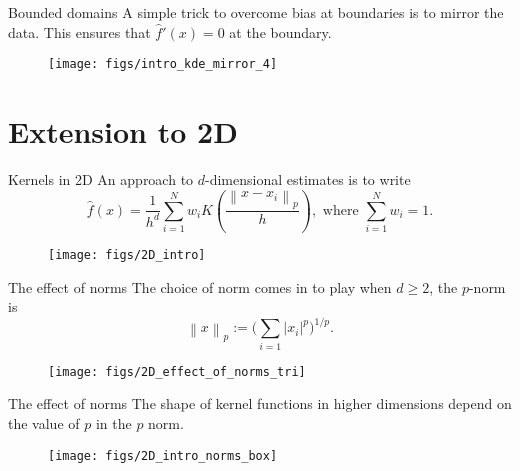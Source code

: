 \documentclass[11pt, aspectratio=149]{beamer}
\theoremstyle{plain}
\begin{document}
\begin{frame}[fragile, t]{Bounded domains}
	A simple trick to overcome bias at boundaries is to mirror the data.
	This ensures that $\hat{f}'(x) = 0$ at the boundary.
	\vfill
	\begin{figure}
		\centering
		\texttt{[image: figs/intro\_kde\_mirror\_4]}
	\end{figure}
\end{frame}


\section{Extension to 2D}


\begin{frame}[fragile, t]{Kernels in 2D}
	An approach to $d$-dimensional estimates is to  write
	\begin{equation*}
	\hat{f}(x) = \frac{1}{h^d} \sum_{i=1}^{N} w_i K \left(\frac{\left \| x - x_i \right \|_p}{h}\right), \text{ where } \sum_{i=1}^{N} w_i = 1.
	\end{equation*}
	\vfill
	\begin{figure}
		\centering
		\texttt{[image: figs/2D\_intro]}
	\end{figure}
\end{frame}


\begin{frame}[fragile, t]{The effect of norms}
	The choice of norm comes in to play when $d \geq 2$, the $p$-norm is 
	\begin{equation*}
		\left\| x \right\| _p := \bigg( \sum_{i=1} \left| x_i \right| ^p \bigg) ^{1/p}.
	\end{equation*}
	\vfill
	\begin{figure}
		\centering
		\texttt{[image: figs/2D\_effect\_of\_norms\_tri]}
	\end{figure}
\end{frame}


\begin{frame}[fragile, t]{The effect of norms}
	The shape of kernel functions in higher dimensions depend on the value of $p$ in the $p$ norm.
	\vfill
	\begin{figure}
		\centering
		\texttt{[image: figs/2D\_intro\_norms\_box]}
	\end{figure}
\end{frame}
\end{document}
